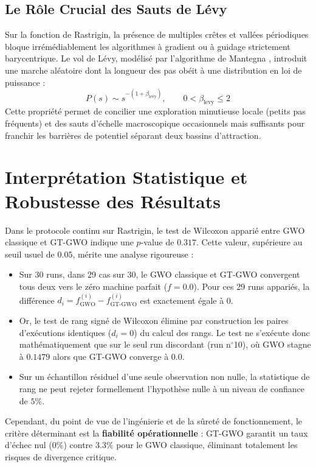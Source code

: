 \subsection{Le Rôle Crucial des Sauts de Lévy}
Sur la fonction de Rastrigin, la présence de multiples crêtes et vallées périodiques bloque irrémédiablement les algorithmes à gradient ou à guidage strictement barycentrique. Le vol de Lévy, modélisé par l'algorithme de Mantegna \cite{mantegna1994fast}, introduit une marche aléatoire dont la longueur des pas obéit à une distribution en loi de puissance :
\begin{equation}
    P(s) \sim s^{-(1 + \beta_{\text{levy}})}, \qquad 0 < \beta_{\text{levy}} \le 2
\end{equation}
Cette propriété permet de concilier une exploration minutieuse locale (petits pas fréquents) et des sauts d'échelle macroscopique occasionnels mais suffisants pour franchir les barrières de potentiel séparant deux bassins d'attraction.

\section{Interprétation Statistique et Robustesse des Résultats}

Dans le protocole continu sur Rastrigin, le test de Wilcoxon apparié entre GWO classique et GT-GWO indique une $p$-value de $0.317$. Cette valeur, supérieure au seuil usuel de $0.05$, mérite une analyse rigoureuse :
\begin{itemize}[label=\textbullet]
    \item Sur 30 runs, dans 29 cas sur 30, le GWO classique et GT-GWO convergent tous deux vers le zéro machine parfait ($f = 0.0$). Pour ces 29 runs appariés, la différence $d_i = f_{\text{GWO}}^{(i)} - f_{\text{GT-GWO}}^{(i)}$ est exactement égale à 0.
    \item Or, le test de rang signé de Wilcoxon élimine par construction les paires d'exécutions identiques ($d_i = 0$) du calcul des rangs. Le test ne s'exécute donc mathématiquement que sur le seul run discordant (run n$^\circ$10), où GWO stagne à $0.1479$ alors que GT-GWO converge à $0.0$.
    \item Sur un échantillon résiduel d'une seule observation non nulle, la statistique de rang ne peut rejeter formellement l'hypothèse nulle à un niveau de confiance de $5\%$.
\end{itemize}
Cependant, du point de vue de l'ingénierie et de la sûreté de fonctionnement, le critère déterminant est la \textbf{fiabilité opérationnelle} : GT-GWO garantit un taux d'échec nul ($0\%$) contre $3.3\%$ pour le GWO classique, éliminant totalement les risques de divergence critique.

